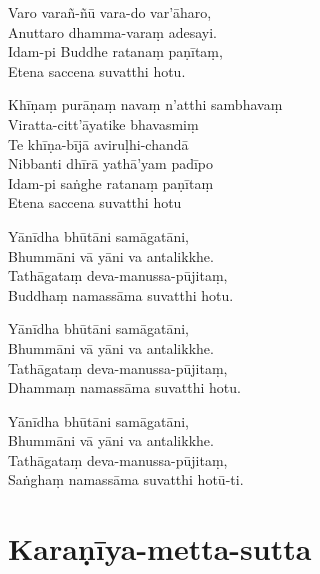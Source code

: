 \begin{paritta}
Varo varañ-ñū vara-do var'āharo,\\
Anuttaro dhamma-varaṃ adesayi.\\
Idam-pi Buddhe ratanaṃ paṇītaṃ,\\
Etena saccena suvatthi hotu.

%
Khīṇaṃ purāṇaṃ navaṃ n'atthi sambhavaṃ\\
Viratta-citt'āyatike bhavasmiṃ\\
Te khīṇa-bījā aviruḷhi-chandā\\
Nibbanti dhīrā yathā'yam padīpo\\
Idam-pi saṅghe ratanaṃ paṇītaṃ\\
Etena saccena suvatthi hotu

Yānīdha bhūtāni samāgatāni,\\
Bhummāni vā yāni va antalikkhe.\\
Tathāgataṃ deva-manussa-pūjitaṃ,\\
Buddhaṃ namassāma suvatthi hotu.

Yānīdha bhūtāni samāgatāni,\\
Bhummāni vā yāni va antalikkhe.\\
Tathāgataṃ deva-manussa-pūjitaṃ,\\
Dhammaṃ namassāma suvatthi hotu.

Yānīdha bhūtāni samāgatāni,\\
Bhummāni vā yāni va antalikkhe.\\
Tathāgataṃ deva-manussa-pūjitaṃ,\\
Saṅghaṃ namassāma suvatthi hotū-ti. 

\end{paritta}

\section{Karaṇīya-metta-sutta}



